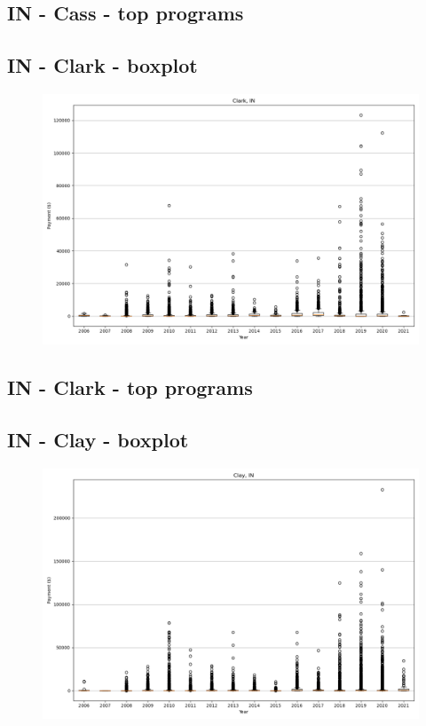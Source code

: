 \subsection*{IN - Cass - top programs}

\newpage
\subsection*{IN - Clark - boxplot}
\begin{figure}[h]
\centering
\includegraphics[width=7in]{../output/boxplots/counties/Clark-IN_boxplot.png}
\end{figure}


\subsection*{IN - Clark - top programs}

\newpage
\subsection*{IN - Clay - boxplot}
\begin{figure}[h]
\centering
\includegraphics[width=7in]{../output/boxplots/counties/Clay-IN_boxplot.png}
\end{figure}


